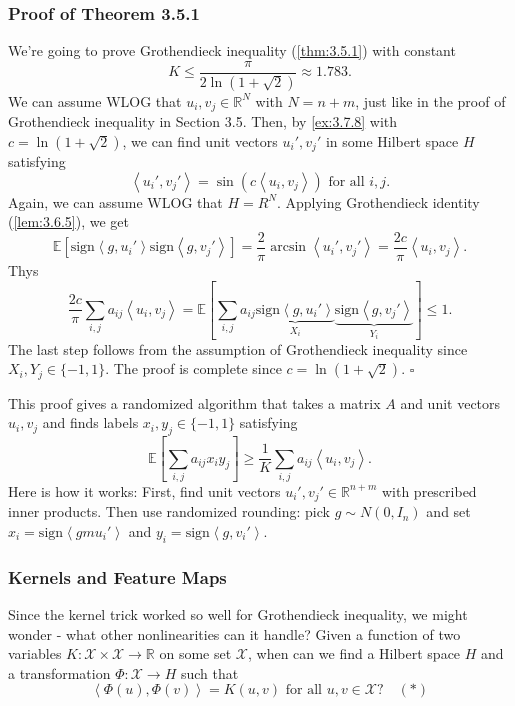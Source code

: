 \subsubsection{Proof of Theorem 3.5.1}
We're going to prove Grothendieck inequality (\cref{thm:3.5.1}) with constant 
\[ K \leq \frac{\pi}{2 \ln{(1 + \sqrt{2})}} \approx 1.783. \]
We can assume WLOG that $u_i, v_j \in \mathbb{R}^N$ with $N = n + m$, just like in the proof of Grothendieck 
inequality in Section 3.5. Then, by \cref{ex:3.7.8} with $c = \ln{(1 + \sqrt{2})}$, we can find unit vectors 
$u_i', v_j'$ in some Hilbert space $H$ satisfying 
\[ \left\langle u_i', v_j' \right\rangle = \sin{(c \left\langle u_i, v_j \right\rangle)} 
\text{ for all } i, j. \]
Again, we can assume WLOG that $H = R^N$. Applying Grothendieck identity (\cref{lem:3.6.5}), we get 
\[ \mathbb{E}\left[ \mathrm{sign}\left\langle g, u_i' \right\rangle 
\mathrm{sign}\left\langle g, v_j' \right\rangle \right] 
= \frac{2}{\pi}\arcsin{\left\langle u_i', v_j' \right\rangle} 
= \frac{2c}{\pi}\left\langle u_i, v_j \right\rangle. \]
Thys 
\[ \frac{2c}{\pi} \sum_{i, j}^{}a_{ij}\left\langle u_i, v_j \right\rangle 
= \mathbb{E}\left[ \sum_{i, j}^{}a_{ij} \underbrace{\mathrm{sign}\left\langle g, u_i' \right\rangle}_{X_i}
\underbrace{\mathrm{sign}\left\langle g, v_j' \right\rangle}_{Y_i} \right] \leq 1. \]
The last step follows from the assumption of Grothendieck inequality since $X_i, Y_j \in \{-1, 1\}$. The 
proof is complete since $c = \ln{(1 + \sqrt{2})}$. $\square$

\begin{remark}
\label{rmk:3.7.9}
This proof gives a randomized algorithm that takes a matrix $A$ and unit vectors $u_i, v_j$ and finds labels 
$x_i, y_j \in \{-1, 1\}$ satisfying 
\[ \mathbb{E}\left[ \sum_{i, j}^{}a_{ij}x_iy_j \right] \geq \frac{1}{K} \sum_{i, j}^{}a_{ij} 
\left\langle u_i, v_j \right\rangle. \]
Here is how it works: First, find unit vectors $u_i', v_j' \in \mathbb{R}^{n + m}$ with prescribed inner 
products. Then use randomized rounding: pick $g \sim N(0, I_n)$ and set $x_i = \mathrm{sign}\left\langle 
gm u_i' \right\rangle$ and $y_i = \mathrm{sign}\left\langle g, v_i' \right\rangle$.
\end{remark}


\subsubsection{Kernels and Feature Maps}
Since the kernel trick worked so well for Grothendieck inequality, we might wonder - what other nonlinearities 
can it handle? Given a function of two variables $K: \mathcal{X} \times \mathcal{X} \to \mathbb{R}$ on some 
set $\mathcal{X}$, when can we find a Hilbert space $H$ and a transformation $\Phi: \mathcal{X} \to H$ such 
that 
\[ \left\langle \Phi(u), \Phi(v) \right\rangle = K(u, v) \text{ for all } u, v \in \mathcal{X}? \quad (*) \]

